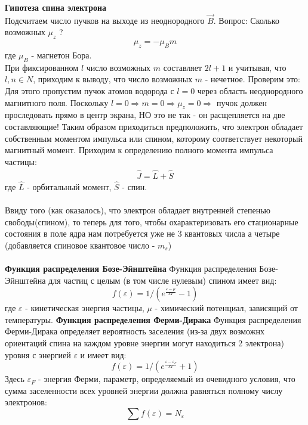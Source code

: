 \documentclass[__main__.tex]{subfiles}
\begin{document}
	\begin{figure}[h]
		\center{\texttt{[image: ch-18]}}
	\end{figure}
	\textbf{Гипотеза спина электрона}\\
	Подсчитаем число пучков на выходе из неоднородного $\vec{B}$. Вопрос: Сколько возможных $\mu_z$ ?
	\begin{gather*}
		\mu_z = -\mu_Bm
	\end{gather*}
	где $\mu_B$ - магнетон Бора.\\
	При фиксированном $l$ число возможных $m$ составляет $2l+1$ и учитывая, что $l,n \in N$, приходим к выводу, что число возможных $m$ - нечетное. Проверим это:\\
	Для этого пропустим пучок атомов водорода с $l=0$ через область неоднородного магнитного поля. Поскольку $l = 0 \Rightarrow m = 0 \Rightarrow \mu_z = 0 \Rightarrow$ пучок должен проследовать прямо в центр экрана, НО это не так - он расщепляется на две составляющие! Таким образом приходиться предположить, что электрон обладает собственным моментом импульса или спином, которому соответствует некоторый магнитный момент. Приходим к определению полного момента импульса частицы:
	\begin{gather*}
		\hat{J} = \hat{L}+\hat{S}
	\end{gather*} 
	где $\hat{L}$ - орбитальный момент, $\hat{S}$ - спин.\\\\
	Ввиду того (как оказалось), что электрон обладает внутренней степенью свободы(спином), то теперь для того, чтобы охарактеризовать его стационарные состояния в поле ядра нам потребуется уже не 3 квантовых числа а четыре (добавляется спиновое квантовое число - $m_s$)\\\\
	\textbf{Функция распределения Бозе-Эйнштейна}
	Функция распределения Бозе-Эйнштейна для частиц с целым (в том числе нулевым) спином имеет вид:
	$$f(\varepsilon) = 1/(e^{\frac{\varepsilon - \mu}{kT}} - 1)$$
	где $\varepsilon$ - кинетическая энергия частицы, $\mu$ - химический потенциал, зависящий от температуры.
	\textbf{Функция распределения Ферми-Дирака}
	Функция распределения Ферми-Дирака определяет вероятность заселения (из-за двух возможнх ориентаций спина на каждом уровне энергии могут находиться 2 электрона) уровня с энергией $\varepsilon$ и имеет вид:
	$$f(\varepsilon) = 1/(e^{\frac{\varepsilon - \varepsilon_F}{kT}} + 1)$$
	Здесь $\varepsilon_F$ - энергия Ферми, параметр, определяемый из очевидного условия, что сумма заселенности всех уровней энергии должна равняться полному числу электронов:
	$$\sum f(\varepsilon) = N_\varepsilon$$
\end{document}
